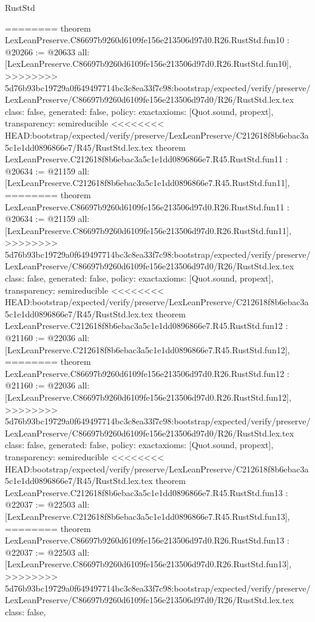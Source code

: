 \begin{lexlean}{RustStd}
\begin{coremodule}
{\begin{coremodule}
{{{{{{{{{{{{{========
theorem LexLeanPreserve.C86697b9260d6109fe156e213506d97d0.R26.RustStd.fun10 : @20266 := @20633 {
  all: [LexLeanPreserve.C86697b9260d6109fe156e213506d97d0.R26.RustStd.fun10],
>>>>>>>> 5d76b93bc19729a0f649497714bc3c8ea33f7c98:bootstrap/expected/verify/preserve/LexLeanPreserve/C86697b9260d6109fe156e213506d97d0/R26/RustStd.lex.tex
  class: false,
  generated: false,
  policy: exact{axioms: [Quot.sound, propext]},
  transparency: semireducible
}
<<<<<<<< HEAD:bootstrap/expected/verify/preserve/LexLeanPreserve/C212618f8b6ebac3a5c1e1dd0896866e7/R45/RustStd.lex.tex
theorem LexLeanPreserve.C212618f8b6ebac3a5c1e1dd0896866e7.R45.RustStd.fun11 : @20634 := @21159 {
  all: [LexLeanPreserve.C212618f8b6ebac3a5c1e1dd0896866e7.R45.RustStd.fun11],
========
theorem LexLeanPreserve.C86697b9260d6109fe156e213506d97d0.R26.RustStd.fun11 : @20634 := @21159 {
  all: [LexLeanPreserve.C86697b9260d6109fe156e213506d97d0.R26.RustStd.fun11],
>>>>>>>> 5d76b93bc19729a0f649497714bc3c8ea33f7c98:bootstrap/expected/verify/preserve/LexLeanPreserve/C86697b9260d6109fe156e213506d97d0/R26/RustStd.lex.tex
  class: false,
  generated: false,
  policy: exact{axioms: [Quot.sound, propext]},
  transparency: semireducible
}
<<<<<<<< HEAD:bootstrap/expected/verify/preserve/LexLeanPreserve/C212618f8b6ebac3a5c1e1dd0896866e7/R45/RustStd.lex.tex
theorem LexLeanPreserve.C212618f8b6ebac3a5c1e1dd0896866e7.R45.RustStd.fun12 : @21160 := @22036 {
  all: [LexLeanPreserve.C212618f8b6ebac3a5c1e1dd0896866e7.R45.RustStd.fun12],
========
theorem LexLeanPreserve.C86697b9260d6109fe156e213506d97d0.R26.RustStd.fun12 : @21160 := @22036 {
  all: [LexLeanPreserve.C86697b9260d6109fe156e213506d97d0.R26.RustStd.fun12],
>>>>>>>> 5d76b93bc19729a0f649497714bc3c8ea33f7c98:bootstrap/expected/verify/preserve/LexLeanPreserve/C86697b9260d6109fe156e213506d97d0/R26/RustStd.lex.tex
  class: false,
  generated: false,
  policy: exact{axioms: [Quot.sound, propext]},
  transparency: semireducible
}
<<<<<<<< HEAD:bootstrap/expected/verify/preserve/LexLeanPreserve/C212618f8b6ebac3a5c1e1dd0896866e7/R45/RustStd.lex.tex
theorem LexLeanPreserve.C212618f8b6ebac3a5c1e1dd0896866e7.R45.RustStd.fun13 : @22037 := @22503 {
  all: [LexLeanPreserve.C212618f8b6ebac3a5c1e1dd0896866e7.R45.RustStd.fun13],
========
theorem LexLeanPreserve.C86697b9260d6109fe156e213506d97d0.R26.RustStd.fun13 : @22037 := @22503 {
  all: [LexLeanPreserve.C86697b9260d6109fe156e213506d97d0.R26.RustStd.fun13],
>>>>>>>> 5d76b93bc19729a0f649497714bc3c8ea33f7c98:bootstrap/expected/verify/preserve/LexLeanPreserve/C86697b9260d6109fe156e213506d97d0/R26/RustStd.lex.tex
  class: false,
}}}}}}}}}}}}}}}}}
\end{coremodule}}
\end{coremodule}
\end{lexlean}
